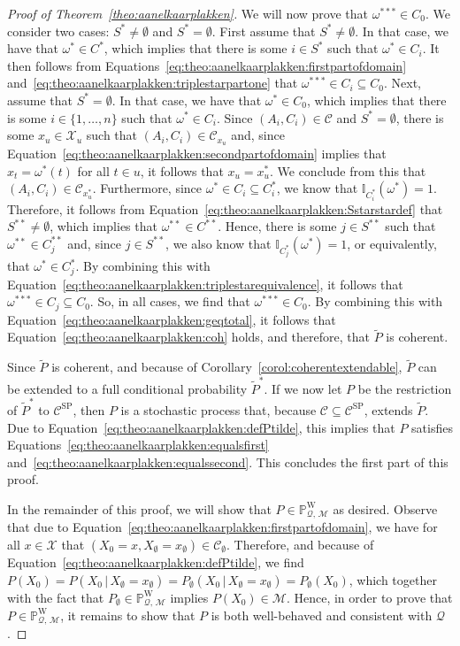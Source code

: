 \documentclass[10pt,a4paper]{paper}
\theoremstyle{definition}
\newcommand{\states}{\mathcal{X}}
\newcommand{\processes}{\mathbb{P}}
\newcommand{\wprocesses}{\processes^{\mathrm{W}}}
\newcommand{\ind}[1]{\mathbb{I}_{#1}}
\newcommand{\rateset}{\mathcal{Q}}
\begin{document}
\begin{proof}[Proof of Theorem~\ref{theo:aanelkaarplakken}]
We will now prove that $\omega^{***}\in C_0$. We consider two cases: $S^*\neq\emptyset$ and $S^*=\emptyset$. First assume that $S^*\neq\emptyset$. In that case, we have that $\omega^*\in C^*$, which implies that there is some $i\in S^*$ such that $\omega^*\in C_i$. It then follows from Equations~\eqref{eq:theo:aanelkaarplakken:firstpartofdomain} and~\eqref{eq:theo:aanelkaarplakken:triplestarpartone} that $\omega^{***}\in C_i\subseteq C_0$. 
Next, assume that $S^*=\emptyset$. In that case, we have that $\omega^*\in C_0$, which implies that there is some $i\in\{1,\dots,n\}$ such that $\omega^*\in C_i$. Since $(A_i,C_i)\in\mathcal{C}$ and $S^*=\emptyset$, there is some $x_u\in\states_u$ such that $(A_i,C_i)\in\mathcal{C}_{x_u}$ and, since Equation~\eqref{eq:theo:aanelkaarplakken:secondpartofdomain} implies that $x_t=\omega^*(t)$ for all $t\in u$, it follows that $x_u=x_u^*$. We conclude from this that $(A_i,C_i)\in\mathcal{C}_{x_u^*}$. Furthermore, since $\omega^*\in C_i\subseteq C_i^*$, we know that $\ind{C_i^*}(\omega^*)=1$. Therefore, it follows from Equation~\eqref{eq:theo:aanelkaarplakken:Sstarstardef} that $S^{**}\neq\emptyset$, which implies that $\omega^{**}\in C^{**}$. Hence, there is some $j\in S^{**}$ such that $\omega^{**}\in C_j^{**}$ and, since $j\in S^{**}$, we also know that $\ind{C_j^*}(\omega^*)=1$, or equivalently, that $\omega^*\in C_j^*$. By combining this with Equation~\eqref{eq:theo:aanelkaarplakken:triplestarequivalence}, it follows that $\omega^{***}\in C_j\subseteq C_0$.
So, in all cases, we find that $\omega^{***}\in C_0$. By combining this with Equation~\eqref{eq:theo:aanelkaarplakken:geqtotal}, it follows that Equation~\eqref{eq:theo:aanelkaarplakken:coh} holds, and therefore, that $\tilde{P}$ is coherent.


Since $\tilde{P}$ is coherent, and because of Corollary~\ref{corol:coherentextendable}, $\tilde{P}$ can be extended to a full conditional probability $\tilde{P}^*$. If we now let $P$ be the restriction of $\tilde{P}^*$ to $\mathcal{C}^\mathrm{SP}$, then $P$ is a stochastic process that, because $\mathcal{C}\subseteq\mathcal{C}^\mathrm{SP}$, extends $\tilde{P}$. Due to Equation~\eqref{eq:theo:aanelkaarplakken:defPtilde}, this implies that $P$ satisfies Equations~\eqref{eq:theo:aanelkaarplakken:equalsfirst} and~\eqref{eq:theo:aanelkaarplakken:equalssecond}. This concludes the first part of this proof.

In the remainder of this proof, we will show that $P\in\wprocesses_{\rateset,\,\mathcal{M}}$ as desired. Observe that due to Equation~\eqref{eq:theo:aanelkaarplakken:firstpartofdomain}, we have for all $x\in\states$ that $(X_0=x,X_{\emptyset}=x_{\emptyset})\in\mathcal{C}_{\emptyset}$. Therefore, and because of Equation~\eqref{eq:theo:aanelkaarplakken:defPtilde}, we find $P(X_0)=P(X_0\,\vert\,X_{\emptyset}=x_{\emptyset})=P_{\emptyset}(X_0\,\vert\,X_{\emptyset}=x_{\emptyset})=P_{\emptyset}(X_0)$, which together with the fact that $P_{\emptyset}\in\wprocesses_{\rateset,\,\mathcal{M}}$ implies $P(X_0)\in\mathcal{M}$. Hence, in order to prove that $P\in\wprocesses_{\rateset,\,\mathcal{M}}$, it remains to show that $P$ is both well-behaved and consistent with $\rateset$.


\end{proof}
\end{document}

